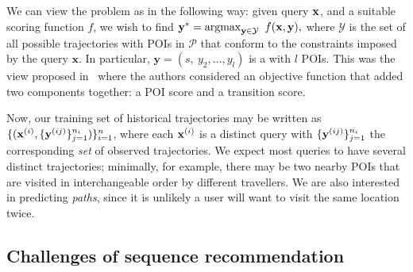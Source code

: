 We can view the {\trajrec} problem as {\seqrec} in the following way:
given {\trajectory} query $\mathbf{x}$, and a suitable scoring function $f$, we wish to find
$\mathbf{y}^* = \operatorname*{argmax}_{\mathbf{y} \in \mathcal{Y}}~f(\mathbf{x}, \mathbf{y}),$
where $\mathcal{Y}$ is the set of all possible trajectories with POIs in $\mathcal{P}$ that conform to the constraints imposed by the query $\mathbf{x}$.
In particular,
$\mathbf{y} = (s,~ y_2, \dots, y_l)$ is a {\trajectory} with $l$ POIs. %
This was the view proposed in~\cite{cikm16paper} where the authors considered an
objective function that added two components together: a POI score and a transition score.

Now, our training set of historical trajectories may be written as
$\{ ( \mathbf{x}^{({i})}, \{ \mathbf{y}^{({ij})} \}_{j=1}^{n_i} ) \}_{i=1}^{n}$,
where each $\mathbf{x}^{({i})}$ is a distinct query
with $\{ \mathbf{y}^{({ij})} \}_{j=1}^{n_i}$ the corresponding \emph{set} of observed trajectories.
We expect most queries to have several distinct trajectories;
minimally,
for example,
there may be two nearby POIs that are visited in interchangeable order by different travellers.
We are also interested in predicting \emph{paths}, %
since it is unlikely a user will want to visit the same location twice.




\subsection{Challenges of sequence recommendation}

